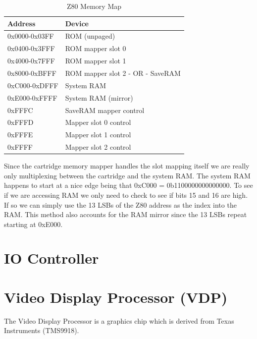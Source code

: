 \documentclass{article}
\begin{document}
\begin{table}[H]
    \centering
    \selectfont
    \begin{tabular}{l|l}
        Address     & Device                           \\
        \hline
        \hline
        0x0000-0x03FF & ROM (unpaged)                    \\ 
        0x0400-0x3FFF & ROM mapper slot 0                \\ 
        0x4000-0x7FFF & ROM mapper slot 1                \\ 
        0x8000-0xBFFF & ROM mapper slot 2 - OR - SaveRAM \\ 
        0xC000-0xDFFF & System RAM                       \\ 
        0xE000-0xFFFF & System RAM (mirror)              \\ 
        0xFFFC       & SaveRAM mapper control           \\ 
        0xFFFD       & Mapper slot 0 control            \\ 
        0xFFFE       & Mapper slot 1 control            \\ 
        0xFFFF       & Mapper slot 2 control            \\
    \end{tabular}
    \fontfamily{}\selectfont
    \caption{Z80 Memory Map \protect\cite{mem_map_table}}
\end{table}

Since the cartridge memory mapper handles the slot mapping itself we are
really only multiplexing between the cartridge and the system RAM.
The system RAM happens to start at a nice edge being that
0xC000 = 0b1100000000000000. To see if we are accessing RAM
we only need to check to see if bits 15 and 16 are high. If so
we can simply use the 13 LSBs of the Z80 address as the index into the RAM. 
This method also accounts for the RAM mirror since the 13 LSBs repeat
starting at 0xE000.

\section{IO Controller}
\section{Video Display Processor (VDP)}

The Video Display Processor is a graphics chip which is derived from 
Texas Instruments (TMS9918). 
\end{document}
